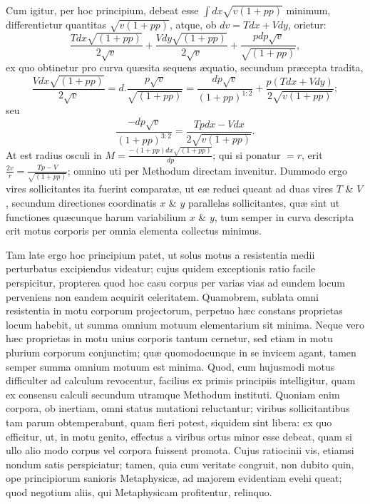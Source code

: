 Cum igitur, per hoc principium, debeat esse $\int dx\sqrt{v(1+pp)}$ minimum, differentietur quantitas $\sqrt{v(1+pp)}$, atque, ob $dv=Tdx+Vdy$, orietur:
\[\frac{Tdx\sqrt{(1+pp)}}{2\sqrt v}+\frac{Vdy\sqrt{(1+pp)}}{2\sqrt v}+\frac{pdp\sqrt v}{\sqrt{(1+pp)}},\]
ex quo obtinetur pro curva quæsita sequens æquatio, secundum præcepta tradita,
\[\frac{Vdx\sqrt{(1+pp)}}{2\sqrt v}=d.\frac{p\sqrt v}{\sqrt{(1+pp)}}=\frac{dp\sqrt v}{(1+pp)^{1:2}}+\frac{p(Tdx+Vdy)}{2\sqrt{v(1+pp)}};\]
seu
\[\frac{-dp\sqrt v}{(1+pp)^{3:2}}=\frac{Tpdx-Vdx}{2\sqrt{v(1+pp)}}.\]
At est radius osculi in $M=\frac{-(1+pp)dx\sqrt{(1+pp)}}{dp}$; qui si ponatur $=r$, erit $\frac{2v}{r}=\frac{Tp-V}{\sqrt{(1+pp)}}$; omnino uti per Methodum directam invenitur. Dummodo ergo vires sollicitantes ita fuerint comparatæ, ut eæ reduci queant ad duas vires $T$ \& $V$, secundum directiones coordinatis $x$ \& $y$ parallelas sollicitantes, quæ sint ut functiones quæcunque harum variabilium $x$ \& $y$, tum semper in curva descripta erit motus corporis per omnia elementa collectus minimus.

Tam late ergo hoc principium patet, ut solus motus a resistentia medii perturbatus excipiendus videatur; cujus quidem exceptionis ratio facile perspicitur, propterea quod hoc casu corpus per varias vias ad eundem locum perveniens non eandem acquirit celeritatem. Quamobrem, sublata omni resistentia in motu corporum projectorum, perpetuo hæc constans proprietas locum habebit, ut summa omnium motuum elementarium sit minima. Neque vero hæc proprietas in motu unius corporis tantum cernetur, sed etiam in motu plurium corporum conjunctim; quæ quomodocunque in se invicem agant, tamen semper summa omnium motuum est minima. Quod, cum hujusmodi motus difficulter ad calculum revocentur, facilius ex primis principiis intelligitur, quam ex consensu calculi secundum utramque Methodum instituti. Quoniam enim corpora, ob inertiam, omni status mutationi reluctantur; viribus sollicitantibus tam parum obtemperabunt, quam fieri potest, siquidem sint libera: ex quo efficitur, ut, in motu genito, effectus a viribus ortus minor esse debeat, quam si ullo alio modo corpus vel corpora fuissent promota. Cujus ratiocinii vis, etiamsi nondum satis perspiciatur; tamen, quia cum veritate congruit, non dubito quin, ope principiorum sanioris Metaphysicæ, ad majorem evidentiam evehi queat; quod negotium aliis, qui Metaphysicam profitentur, relinquo.
